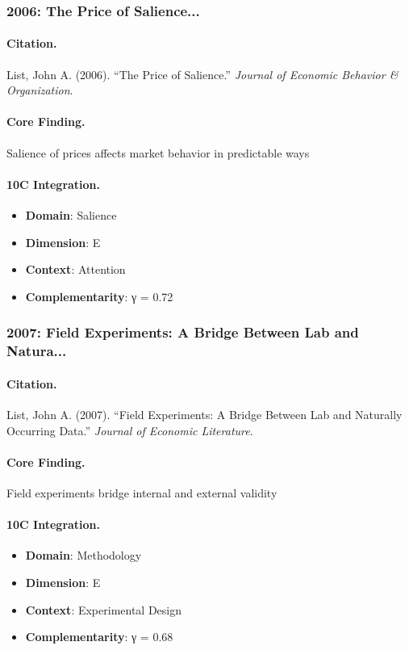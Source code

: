 \subsubsection{2006: The Price of Salience...}

\paragraph{Citation.}
List, John A. (2006). ``The Price of Salience.''
\textit{Journal of Economic Behavior & Organization}.

\paragraph{Core Finding.}
Salience of prices affects market behavior in predictable ways

\paragraph{10C Integration.}
\begin{itemize}[nosep]
  \item \textbf{Domain}: Salience
  \item \textbf{Dimension}: E
  \item \textbf{Context}: Attention
  \item \textbf{Complementarity}: γ = 0.72
\end{itemize}


\subsubsection{2007: Field Experiments: A Bridge Between Lab and Natura...}

\paragraph{Citation.}
List, John A. (2007). ``Field Experiments: A Bridge Between Lab and Naturally Occurring Data.''
\textit{Journal of Economic Literature}.

\paragraph{Core Finding.}
Field experiments bridge internal and external validity

\paragraph{10C Integration.}
\begin{itemize}[nosep]
  \item \textbf{Domain}: Methodology
  \item \textbf{Dimension}: E
  \item \textbf{Context}: Experimental Design
  \item \textbf{Complementarity}: γ = 0.68
\end{itemize}


